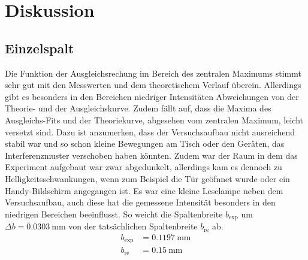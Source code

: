 \section{Diskussion}
\label{sec:Diskussion}

\subsection{Einzelspalt}
Die Funktion der Ausgleichsrechung im Bereich des zentralen Maximums stimmt sehr gut mit den Messwerten und dem theoretischem Verlauf überein.
Allerdings gibt es besonders in den Bereichen niedriger Intensitäten Abweichungen von der Theorie- und der Ausgleichskurve.
Zudem fällt auf, dass die Maxima des Ausgleichs-Fits und der Theoriekurve, abgesehen vom zentralen Maximum, leicht versetzt sind.
Dazu ist anzumerken, dass der Versuchsaufbau nicht ausreichend stabil war und so schon kleine Bewegungen am Tisch oder den Geräten, das Interferenzmuster verschoben haben könnten.
Zudem war der Raum in dem das Experiment aufgebaut war zwar abgedunkelt, allerdings kam es dennoch zu Helligkeitsschwankungen, wenn zum Beispiel die Tür geöfnnet wurde oder ein Handy-Bildschirm angegangen ist.
Es war eine kleine Leselampe neben dem Versuchsaufbau, auch diese hat die gemessene Intensität besonders in den niedrigen Bereichen beeinflusst.
So weicht die Spaltenbreite $b_\text{exp}$ um $\Delta b = \SI{0.0303}{\milli\meter}$ von der tatsächlichen Spaltenbreite $b_\text{re}$ ab.
\begin{align*}
b_\text{exp} &= \SI{0.1197}{\milli\meter}\\
b_\text{re} &= \SI{0.15}{\milli\meter}
\end{align*}

